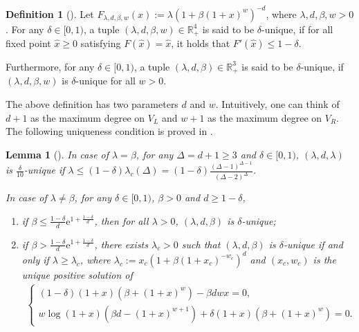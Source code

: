 \documentclass[11pt,a4paper]{article}
\newcommand{\e}{\mathrm{e}}
\newtheorem{lemma}[theorem]{Lemma}
\theoremstyle{definition}
\newtheorem{definition}[theorem]{Definition}
\begin{document}
\begin{definition}[\cite{Chen0Y23}]
Let $F_{\lambda,d,\beta,w}(x):=\lambda(1+\beta(1+x)^w)^{-d}$, where $\lambda,d,\beta,w>0$.
For any $\delta\in [0,1)$, a tuple $(\lambda,d,\beta,w)\in \mathbb{R}_{+}^4$ is said to be $\delta$-unique, if for all fixed point $\hat{x}\geq 0$ satisfying $F(\hat{x})=\hat{x}$, it holds that $F'(\hat{x})\leq 1-\delta$.      

Furthermore, for any $\delta\in [0,1)$, a tuple $(\lambda,d,\beta)\in \mathbb{R}_{+}^3$ is said to be $\delta$-unique,   if $(\lambda,d,\beta,w)$ is $\delta$-unique for all $w>0$.
\end{definition}

The above definition has two parameters $d$ and $w$. Intuitively, one can think of $d+1$ as the maximum degree on $V_L$ and $w+1$ as the maximum degree on $V_R$. The following uniqueness condition is proved in \cite{Chen0Y23}.

\begin{lemma}[]\label{lem:unique-simple}
In case of $\lambda = \beta$, for any $\Delta=d+1\geq 3$ and $\delta\in [0,1)$, $(\lambda,d,\lambda)$ is $\frac{\delta}{10}$-unique if $\lambda\leq (1-\delta)\lambda_c(\Delta) = (1-\delta)\frac{(\Delta-1)^{\Delta-1}}{(\Delta-2)^\Delta}$.

In case of $\lambda \neq \beta$, for any $\delta\in [0,1)$, $\beta>0$ and $d\geq 1-\delta$,
\begin{enumerate}
    \item if $\beta \leq \frac{1-\delta}{d}\e ^{1+\frac{1-\delta}{d}}$, then for all $\lambda>0$, $(\lambda,d,\beta)$ is $\delta$-unique;
    \item  if $\beta > \frac{1-\delta}{d}\e ^{1+\frac{1-\delta}{d}}$, there exists $\lambda_c>0$ such that $(\lambda,d,\beta)$ is $\delta$-unique if and only if $\lambda \geq \lambda_c$, where $\lambda_c:=x_c(1+\beta(1+x_c)^{-w_c})^d$ and $(x_c,w_c)$ is the unique positive solution of
    \begin{align}\label{eq:unique-condition}
            \begin{cases}
                (1-\delta)(1+x)(\beta+(1+x)^w)-\beta d w x=0,\\
                w \log (1+x) (\beta d-(1+x)^{w+1}) + \delta(1+x)(\beta+(1+x)^w)=0.
            \end{cases}
    \end{align}
    \end{enumerate}
\end{lemma}
\end{document}
